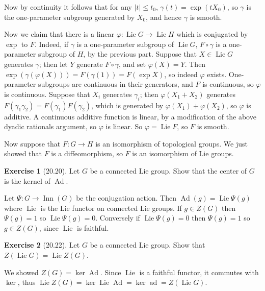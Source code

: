 \documentclass[10pt]{article}
\newcommand{\Inn}{\operatorname{Inn}}
\DeclareMathOperator{\Lie}{Lie}
\DeclareMathOperator{\ad}{ad}
\DeclareMathOperator{\Ad}{Ad}
\theoremstyle{definition}
\newtheorem{exer}{Exercise}
\begin{document}
Now by continuity it follows that for any $|t| \leq t_0$, $\gamma(t) = \exp(tX_0)$, so $\gamma$ is the one-parameter subgroup generated by $X_0$, and hence $\gamma$ is smooth.

Now we claim that there is a linear $\varphi: \Lie G \to \Lie H$ which is conjugated by $\exp$ to $F$.
Indeed, if $\gamma$ is a one-parameter subgroup of $\Lie G$, $F \circ \gamma$ is a one-parameter subgroup of $H$, by the previous part.
Suppose that $X \in \Lie G$ generates $\gamma$; then let $Y$ generate $F \circ \gamma$, and set $\varphi(X) = Y$.
Then $\exp(\gamma(\varphi(X))) = F(\gamma(1)) = F(\exp X)$, so indeed $\varphi$ exists.
One-parameter subgroups are continuous in their generators, and $F$ is continuous, so $\varphi$ is continuous.
Suppose that $X_i$ generates $\gamma_i$; then $\varphi(X_1 + X_2)$ generates $F(\gamma_1 \gamma_2) = F(\gamma_1) F(\gamma_2)$, which is generated by $\varphi(X_1) + \varphi(X_2)$, so $\varphi$ is additive.
A continuous additive function is linear, by a modification of the above dyadic rationals argument, so $\varphi$ is linear.
So $\varphi = \Lie F$, so $F$ is smooth.

Now suppose that $F: G \to H$ is an isomorphism of topological groups.
We just showed that $F$ is a diffeomorphism, so $F$ is an isomorphism of Lie groups.

\begin{exer}[20.20]
Let $G$ be a connected Lie group.
Show that the center of $G$ is the kernel of $\Ad$.
\end{exer}

Let $\Psi: G \to \Inn(G)$ be the conjugation action.
Then $\Ad(g) = \Lie \Psi(g)$ where $\Lie$ is the Lie functor on connected Lie groups.
If $g \in Z(G)$ then $\Psi(g) = 1$ so $\Lie \Psi(g) = 0$.
Conversely if $\Lie \Psi(g) = 0$ then $\Psi(g) = 1$ so $g \in Z(G)$, since $\Lie$ is faithful.

\begin{exer}[20.22]
Let $G$ be a connected Lie group.
Show that $Z(\Lie G) = \Lie Z(G)$.
\end{exer}

We showed $Z(G) = \ker \Ad$. Since $\Lie$ is a faithful functor, it commutes with $\ker$, thus $\Lie Z(G) = \ker \Lie \Ad = \ker \ad = Z(\Lie G)$.
\end{document}
